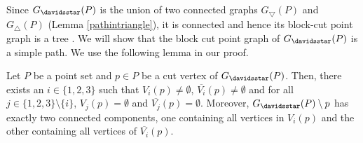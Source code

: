 Since $G_{\davidsstar}(P)$ is the union of two connected graphs $G_{\bigtriangledown}(P)$ and $G_{\bigtriangleup}(P)$ (Lemma \ref{pathintriangle}), 
it is connected and hence its block-cut point graph is a tree \cite{Diestel}. We will show that the block cut point graph of $G_{\davidsstar}(P)$ is 
a simple path. We use the following lemma in our proof.
\begin{lemma}\label{numcomp}
Let $P$ be a point set and $p \in P$ be a cut vertex of $G_{\davidsstar}(P)$. Then, there exists an $i \in \{1, 2, 3\}$ such that ${V_i}(p)\ne \emptyset$, 
$\overline{V_i}(p)\ne \emptyset$ and for all $j \in \{1, 2, 3\} \setminus\{i\}$, ${V_j}(p) = \emptyset$ and $\overline{V_j}(p) = \emptyset$. 
Moreover, $G_{\davidsstar}(P) \setminus p$ has exactly two connected components, one containing all vertices in $V_i(p)$ and the other containing 
all vertices of $\overline{V_i}(p)$.
 \end{lemma}
